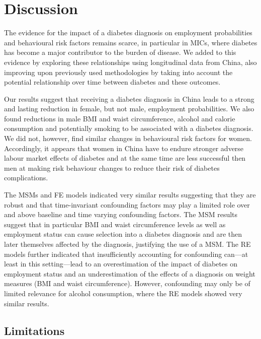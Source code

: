 \section{\label{sec:Discussion5}Discussion}

The evidence for the impact of a diabetes diagnosis on employment probabilities and behavioural risk factors remains scarce, in particular in \acp{MIC}, where diabetes has become a major contributor to the burden of disease. We added to this evidence by exploring these relationships using longitudinal data from China, also improving upon previously used methodologies by taking into account the potential relationship over time between diabetes and these outcomes.

Our results suggest that receiving a diabetes diagnosis in China leads to a strong and lasting reduction in female, but not male, employment probabilities. We also found reductions in male \ac{BMI} and waist circumference, alcohol and calorie consumption and potentially smoking to be associated with a diabetes diagnosis. We did not, however, find similar changes in behavioural risk factors for women. Accordingly, it appears that women in China have to endure stronger adverse labour market effects of diabetes and at the same time are less successful then men at making risk behaviour changes to reduce their risk of diabetes complications.

The \acp{MSM} and \ac{FE} models indicated very similar results suggesting that they are robust and that time-invariant confounding factors may play a limited role over and above baseline and time varying confounding factors. The \ac{MSM} results suggest that in particular \ac{BMI} and waist circumference levels as well as employment status can cause selection into a diabetes diagnosis and are then later themselves affected by the diagnosis, justifying the use of a \ac{MSM}. The \ac{RE} models further indicated that insufficiently accounting for confounding can---at least in this setting---lead to an overestimation of the impact of diabetes on employment status and an underestimation of the effects of a diagnosis on weight measures (\ac{BMI} and waist circumference). However, confounding may only be of limited relevance for  alcohol consumption, where the \ac{RE} models showed very similar results.

\subsection{Limitations}

